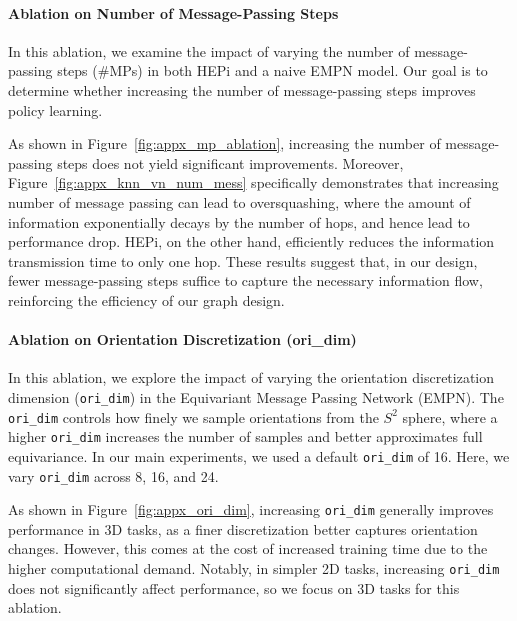 

\paragraph{Ablation on Number of Message-Passing Steps}

In this ablation, we examine the impact of varying the number of message-passing steps (\#MPs) in both HEPi and a naive EMPN model. Our goal is to determine whether increasing the number of message-passing steps improves policy learning.

As shown in Figure~\ref{fig:appx_mp_ablation}, increasing the number of message-passing steps does not yield significant improvements. Moreover, Figure~\ref{fig:appx_knn_vn_num_mess} specifically demonstrates that increasing number of message passing can lead to oversquashing, where the amount of information exponentially decays by the number of hops, and hence lead to performance drop. HEPi, on the other hand, efficiently reduces the information transmission time to only one hop. These results suggest that, in our design, fewer message-passing steps suffice to capture the necessary information flow, reinforcing the efficiency of our graph design.




\paragraph{Ablation on Orientation Discretization (ori\_dim)}

In this ablation, we explore the impact of varying the orientation discretization dimension (\texttt{ori\_dim}) in the Equivariant Message Passing Network (EMPN). The \texttt{ori\_dim} controls how finely we sample orientations from the $S^2$ sphere, where a higher \texttt{ori\_dim} increases the number of samples and better approximates full equivariance. In our main experiments, we used a default \texttt{ori\_dim} of 16. Here, we vary \texttt{ori\_dim} across 8, 16, and 24.

As shown in Figure~\ref{fig:appx_ori_dim}, increasing \texttt{ori\_dim} generally improves performance in 3D tasks, as a finer discretization better captures orientation changes. However, this comes at the cost of increased training time due to the higher computational demand. Notably, in simpler 2D tasks, increasing \texttt{ori\_dim} does not significantly affect performance, so we focus on 3D tasks for this ablation.



